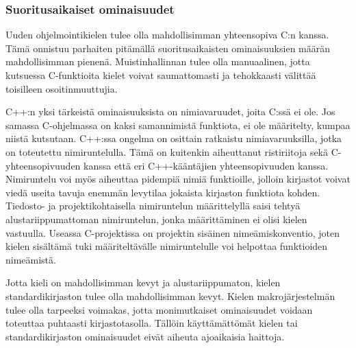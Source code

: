 \subsubsection{Suoritusaikaiset ominaisuudet}

Uuden ohjelmointikielen tulee olla mahdollisimman yhteensopiva C:n kanssa. Tämä
onnistuu parhaiten pitämällä suoritusaikaisten ominaisuuksien määrän mahdollisimman
pienenä. Muistinhallinnan tulee olla manuaalinen, jotta kutsuessa C-funktioita
kielet voivat saumattomasti ja tehokkaasti välittää toisilleen
osoitinmuuttujia.


C++:n yksi tärkeistä ominaisuuksista on nimiavaruudet, joita C:ssä ei ole. Jos
samassa C-ohjelmassa on kaksi samannimistä funktiota, ei ole määritelty, kumpaa
niistä kutsutaan. C++:ssa ongelma on osittain ratkaistu nimiavaruuksilla, jotka
on toteutettu nimiruntelulla. Tämä on kuitenkin aiheuttanut ristiriitoja sekä
C-yhteensopivuuden kanssa että eri C++-kääntäjien yhteensopivuuden kanssa.
Nimiruntelu voi myös aiheuttaa pidempiä nimiä funktioille, jolloin kirjastot
voivat viedä useita tavuja enemmän levytilaa jokaista kirjaston funktiota
kohden. Tiedosto- ja projektikohtaisella nimiruntelun määrittelyllä saisi
tehtyä alustariippumattoman nimiruntelun, jonka määrittäminen ei olisi kielen
vastuulla. Useassa C-projektissa on projektin sisäinen nimeämiskonventio, joten
kielen sisältämä tuki määriteltävälle nimiruntelulle voi helpottaa funktioiden
nimeämistä.

Jotta kieli on mahdollisimman kevyt ja alustariippumaton, kielen
standardikirjaston tulee olla mahdollisimman kevyt. Kielen makrojärjestelmän
tulee olla tarpeeksi voimakas, jotta monimutkaiset ominaisuudet voidaan
toteuttaa puhtaasti kirjastotasolla. Tällöin käyttämättömät kielen tai
standardikirjaston ominaisuudet eivät aiheuta ajoaikaisia haittoja.


